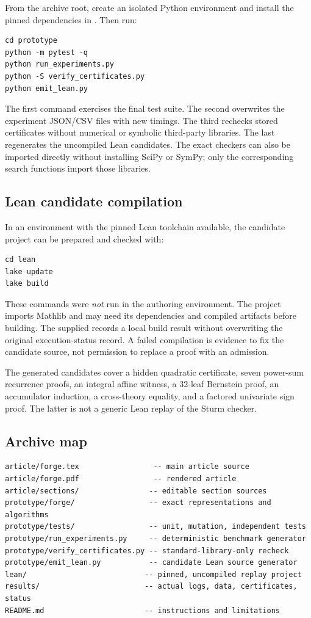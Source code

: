 From the archive root, create an isolated Python environment and install the pinned dependencies in . Then run:

\begin{lstlisting}
cd prototype
python -m pytest -q
python run_experiments.py
python -S verify_certificates.py
python emit_lean.py
\end{lstlisting}

The first command exercises the final test suite. The second overwrites the experiment JSON/CSV files with new timings. The third rechecks stored certificates without numerical or symbolic third-party libraries. The last regenerates the uncompiled Lean candidates. The exact checkers can also be imported directly without installing SciPy or SymPy; only the corresponding search functions import those libraries.

\subsection{Lean candidate compilation}

In an environment with the pinned Lean toolchain available, the candidate project can be prepared and checked with:

\begin{lstlisting}
cd lean
lake update
lake build
\end{lstlisting}

These commands were \emph{not} run in the authoring environment. The project imports Mathlib and may need its dependencies and compiled artifacts before building. The supplied  records a local build result without overwriting the original execution-status record. A failed compilation is evidence to fix the candidate source, not permission to replace a proof with an admission.

The generated candidates cover a hidden quadratic certificate, seven power-sum recurrence proofs, an integral affine witness, a 32-leaf Bernstein proof, an accumulator induction, a cross-theory equality, and a factored univariate sign proof. The latter is not a generic Lean replay of the Sturm checker.

\subsection{Archive map}

\begin{lstlisting}
article/forge.tex                 -- main article source
article/forge.pdf                 -- rendered article
article/sections/                -- editable section sources
prototype/forge/                 -- exact representations and algorithms
prototype/tests/                 -- unit, mutation, independent tests
prototype/run_experiments.py     -- deterministic benchmark generator
prototype/verify_certificates.py -- standard-library-only recheck
prototype/emit_lean.py           -- candidate Lean source generator
lean/                           -- pinned, uncompiled replay project
results/                        -- actual logs, data, certificates, status
README.md                       -- instructions and limitations
\end{lstlisting}

